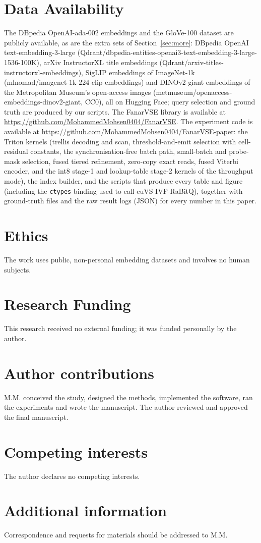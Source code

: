 \documentclass[fleqn,10pt]{wlscirep}
\begin{document}
\section*{Data Availability}
The DBpedia OpenAI-ada-002 embeddings and the GloVe-100 dataset are publicly available, as are the extra sets of Section~\ref{sec:more}: DBpedia OpenAI text-embedding-3-large (Qdrant/dbpedia-entities-openai3-text-embedding-3-large-1536-100K), arXiv InstructorXL title embeddings (Qdrant/arxiv-titles-instructorxl-embeddings), SigLIP embeddings of ImageNet-1k (mlnomad/imagenet-1k-224-clip-embeddings) and DINOv2-giant embeddings of the Metropolitan Museum's open-access images (metmuseum/openaccess-embeddings-dinov2-giant, CC0), all on Hugging Face; query selection and ground truth are produced by our scripts. The FanarVSE library is available at \url{https://github.com/MohammedMohsen0404/FanarVSE}. The experiment code is available at \url{https://github.com/MohammedMohsen0404/FanarVSE-paper}: the Triton kernels (trellis decoding and scan, threshold-and-emit selection with cell-residual constants, the synchronisation-free batch path, small-batch and probe-mask selection, fused tiered refinement, zero-copy exact reads, fused Viterbi encoder, and the int8 stage-1 and lookup-table stage-2 kernels of the throughput mode), the index builder, and the scripts that produce every table and figure (including the \texttt{ctypes} binding used to call cuVS IVF-RaBitQ), together with ground-truth files and the raw result logs (JSON) for every number in this paper.

\section*{Ethics}
The work uses public, non-personal embedding datasets and involves no human subjects.

\section*{Research Funding}
This research received no external funding; it was funded personally by the author.

\section*{Author contributions}
M.M. conceived the study, designed the methods, implemented the software, ran the experiments and wrote the manuscript. The author reviewed and approved the final manuscript.

\section*{Competing interests}
The author declares no competing interests.

\section*{Additional information}
Correspondence and requests for materials should be addressed to M.M.
\end{document}
